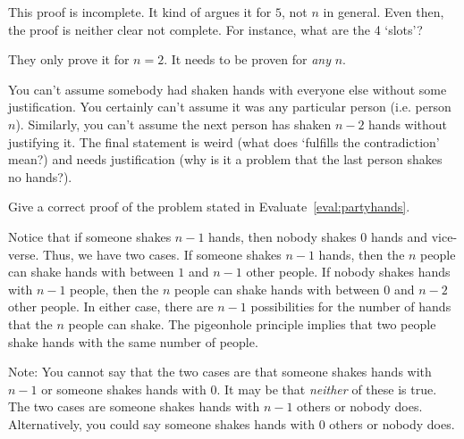 \begin{eval}
\begin{spfenum}
\noindent
\evallinetwo
\end{spfenum}
\begin{answer}
\begin{pfevalenum}
\item
This proof is incomplete.  It kind of argues it for $5$, not $n$ in general.
Even then, the proof is neither clear not complete.  For instance, what are
the 4 `slots'?
\item
They only prove it for $n=2$.  It needs to be proven for {\em any} $n$.
\item
You can't assume somebody had shaken hands with everyone else without some justification.  
You certainly can't assume it was any particular person (i.e. person $n$).  
Similarly, you can't assume the next person has shaken $n-2$ hands without justifying it. 
The final statement is weird (what does `fulfills the contradiction' mean?)
and needs justification (why is it a problem that the last person shakes no hands?).
\end{pfevalenum}
\end{answer}
\end{eval}

\begin{exer}
Give a correct proof of the problem stated in Evaluate~\ref{eval:partyhands}.
\vspace*{3.25in}
\begin{answer}
Notice that if someone shakes $n-1$ hands, then nobody shakes $0$ hands and vice-verse.
Thus, we have two cases.  
If someone shakes $n-1$ hands, then the $n$ people can shake
hands with between $1$ and $n-1$ other people. 
If nobody shakes hands with $n-1$ people, then the $n$ people can shake
hands with between $0$ and $n-2$ other people. In either case, there are $n-1$
possibilities for the number of hands that the $n$ people can shake.
The pigeonhole principle implies that two people shake hands with the same number of people. 

Note:  You cannot say that the two cases are that someone shakes hands with $n-1$ or
someone shakes hands with $0$. It may be that {\em neither} of these is true.
The two cases are someone shakes hands with $n-1$ others or nobody does.  Alternatively,
you could say someone shakes hands with $0$ others or nobody does.
\end{answer}
\end{exer}


